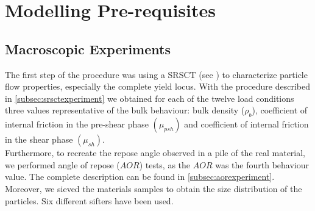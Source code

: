 \section{Modelling Pre-requisites}
\label{sec:modellingprerequisites}

\subsection{Macroscopic Experiments}
\label{subsec:Macroscopicexperiments}

The first step of the procedure was using a SRSCT (see \cite{RefWorks:142}) to characterize particle flow properties, 
especially the complete yield locus.
With the procedure described in \ref{subsec:srsctexperiment} we
obtained for each of the twelve load conditions three values representative of the bulk behaviour: bulk density ($\rho_b$),
coefficient of internal friction in the pre-shear phase $ (\mu_{psh})$ and
coefficient of internal friction in the shear phase  $ (\mu_{sh})$.\\
Furthermore, to recreate the repose angle observed in a pile of the real material, 
we performed angle of repose ($AOR$) tests, as the $AOR$ was the fourth
behaviour value. The complete description can be found in
\ref{subsec:aorexperiment}.
Moreover, we sieved the materials samples to obtain the size distribution of the
particles. Six different sifters have been used.\\

